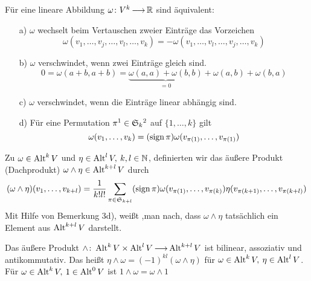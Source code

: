 \documentclass[skript.tex]{subfiles}
\begin{document}
	\begin{bem}
		Für eine lineare Abbildung $\omega \colon V^k \kern -1pt \longrightarrow \kern -1pt \mathbb{R}$ sind äquivalent:
		\begin{itemize}
			\item[a)]$\omega$ wechselt beim Vertauschen zweier Einträge das Vorzeichen  
			\[  
				\omega(v_1, \dots, v_j, \dots, v_l, \dots, v_k) = - \omega(v_1, \dots, v_l, \dots, v_j, \dots, v_k)
			\]
			\item[b)]$\omega$ verschwindet, wenn zwei Einträge gleich sind.
			\[
				0= \omega(a+b,a+b) = \underbrace{\omega(a,a) + \omega(b,b)}_{=0} + \omega(a,b) + \omega(b,a)
			\]
			\item[c)] $\omega$ verschwindet, wenn die Einträge linear abhängig sind.
			\item[d)] Für eine Permutation $\pi \footnotemark  \in \mf{S}_k \footnotemark$   auf $\{1, \dots, k\}$ gilt 
			\[
				\omega(v_1, \dots, v_k) = (\operatorname{sign} \pi) \omega(v_{\pi(1)}, \dots, v_{\pi(1)})
			\]
		\end{itemize}
	\end{bem}

	\begin{defin}
		Zu $\omega \in \operatorname{Alt}^k V$ und $\eta \in \alt^l V, \: k,l %
		 \in \N$, definierten wir das äußere Produkt (Dachprodukt) $\omega \wedge \eta \in \operatorname{Alt}^{k+l} V$ durch 
		 \begin{equation*}
		 (\omega \wedge \eta)(v_1, \dots, v_{k+l}) = \frac{1}{k!l!} \sum_{\pi \in \mathfrak{S}_{k+l}} (\operatorname{sign} \pi) \omega (v_{\pi(1)}, \dots, v_{\pi(k)}) \eta(v_{\pi(k+1)}, \dots, v_{\pi(k+l)})
		 \end{equation*}
		 Mit Hilfe von Bemerkung 3d), weißt ,man nach, dass $\omega \wedge \eta$ tatsächlich ein Element aus $\operatorname{Alt}^{k+l}V$ darstellt.
	\end{defin}

	\begin{lem}
		Das äußere Produkt $\wedge \colon \operatorname{Alt}^k V \times \operatorname{Alt}^l V \kern -1pt \longrightarrow \kern -1pt \operatorname{Alt}^{k+l} V$ ist bilinear, assoziativ und antikommutativ. Das heißt $\eta \wedge \omega = (-1)^{kl}(\omega \wedge \eta)$ für $\omega \in \operatorname{Alt}^k V, \: \eta \in \operatorname{Alt}^l V$. Für $\omega \in \operatorname{Alt}^k V, \: 1 \in \operatorname{Alt}^0 V$ ist $ 1 \wedge \omega = \omega \wedge 1$
	\end{lem}
	
\end{document}
